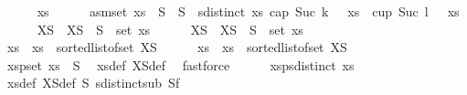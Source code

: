 \begin{isabellebody}
\ \ \ \ \isamarkupfalse%
\ xs\isanewline
\ \ \ \ \isamarkupfalse%
\ asm{\isacharcolon}{\kern0pt}{\isachardoublequoteopen}set\ xs\ {\isasymsubseteq}\ S{}\ {\isasymunion}\ S{}\ {\isasymand}\ sdistinct\ xs{\isachardoublequoteclose}\ {\isachardoublequoteopen}cap\ {\isacharparenleft}{\kern0pt}Suc\ {\isacharparenleft}{\kern0pt}k\ {\isacharplus}{\kern0pt}\ {}{\isacharparenright}{\kern0pt}{\isacharparenright}{\kern0pt}\ xs\ {\isasymor}\ cup\ {\isacharparenleft}{\kern0pt}Suc\ {\isacharparenleft}{\kern0pt}l\ {\isacharplus}{\kern0pt}\ {}{\isacharparenright}{\kern0pt}{\isacharparenright}{\kern0pt}\ xs{\isachardoublequoteclose}\isanewline
\ \ \ \ \isamarkupfalse%
\ XS{}\ \ {\isachardoublequoteopen}XS{}\ {\isacharequal}{\kern0pt}\ S{}\ {\isasyminter}\ set\ xs{\isachardoublequoteclose}\isanewline
\ \ \ \ \isamarkupfalse%
\ XS{}\ \ {\isachardoublequoteopen}XS{}\ {\isacharequal}{\kern0pt}\ S{}\ {\isasyminter}\ set\ xs{\isachardoublequoteclose}\isanewline
\ \ \ \ \isamarkupfalse%
\ xs{}\ \ {\isachardoublequoteopen}xs{}\ {\isacharequal}{\kern0pt}\ sorted{\isacharunderscore}{\kern0pt}list{\isacharunderscore}{\kern0pt}of{\isacharunderscore}{\kern0pt}set\ XS{}{\isachardoublequoteclose}\isanewline
\ \ \ \ \isamarkupfalse%
\ xs{}\ \ {\isachardoublequoteopen}xs{}\ {\isacharequal}{\kern0pt}\ sorted{\isacharunderscore}{\kern0pt}list{\isacharunderscore}{\kern0pt}of{\isacharunderscore}{\kern0pt}set\ XS{}{\isachardoublequoteclose}\isanewline
\isanewline
\ \ \ \ \isamarkupfalse%
\ xs{}p{}{\isacharcolon}{\kern0pt}{\isachardoublequoteopen}set\ xs{}\ {\isasymsubseteq}\ S{}{\isachardoublequoteclose}\ \isamarkupfalse%
\ xs{}{\isacharunderscore}{\kern0pt}def\ XS{}{\isacharunderscore}{\kern0pt}def\ \isamarkupfalse%
\ fastforce\isanewline
\ \ \ \ \isamarkupfalse%
\ xs{}p{}{\isacharcolon}{\kern0pt}{\isachardoublequoteopen}sdistinct\ xs{}{\isachardoublequoteclose}\ \isamarkupfalse%
\ xs{}{\isacharunderscore}{\kern0pt}def\ XS{}{\isacharunderscore}{\kern0pt}def\ S{}{\isacharparenleft}{\kern0pt}{}{\isacharparenright}{\kern0pt}\ sdistinct{\isacharunderscore}{\kern0pt}sub\ S{}f\isanewline

\end{isabellebody}
